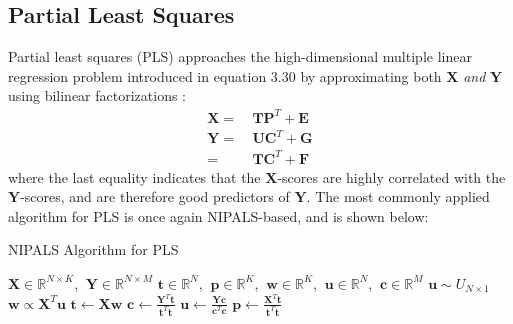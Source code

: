 \subsection{Partial Least Squares}

\begin{doublespace}
Partial least squares (PLS) approaches the high-dimensional multiple linear
regression problem introduced in equation 3.30 by approximating both
$\mathbf{X}$ \emph{and} $\mathbf{Y}$ using bilinear factorizations
\cite{wold:cils2001}:
\begin{align}
\mathbf{X} =& \: \mathbf{T} \mathbf{P}^T + \mathbf{E} \\
\mathbf{Y} =& \: \mathbf{U} \mathbf{C}^T + \mathbf{G} \\
           =& \: \mathbf{T} \mathbf{C}^T + \mathbf{F} \nonumber
\end{align}
where the last equality indicates that the $\mathbf{X}$-scores are highly
correlated with the $\mathbf{Y}$-scores, and are therefore good predictors
of $\mathbf{Y}$. The most commonly applied algorithm for PLS is once again
NIPALS-based, and is shown below:
\end{doublespace}

\begin{algorithm}[H]
\caption{NIPALS Algorithm for PLS}
\label{algorithm.3.2}
\begin{algorithmic}[1]
\REQUIRE $\mathbf{X} \in \mathbb{R}^{N \times K}$,%
       $\:\mathbf{Y} \in \mathbb{R}^{N \times M}$
\ENSURE $\mathbf{t} \in \mathbb{R}^N$,%
      $\:\mathbf{p} \in \mathbb{R}^K$,%
      $\:\mathbf{w} \in \mathbb{R}^K$,%
      $\:\mathbf{u} \in \mathbb{R}^N$,%
      $\:\mathbf{c} \in \mathbb{R}^M$
\STATE $\mathbf{u} \sim U_{N \times 1}$ 
\REPEAT
  \STATE $\mathbf{w} \propto \mathbf{X}^T \mathbf{u}$
  \STATE $\mathbf{t} \gets \mathbf{X} \mathbf{w}$
  \STATE $\mathbf{c} \gets \tfrac{\mathbf{Y}^T \mathbf{t}}
                                 {\mathbf{t}^T \mathbf{t}}$
  \STATE $\mathbf{u} \gets \tfrac{\mathbf{Y} \mathbf{c}}
                                 {\mathbf{c}^T \mathbf{c}}$
\UNTIL{$\tau < \varepsilon$}
\STATE $\mathbf{p} \gets \tfrac{\mathbf{X}^T \mathbf{t}}
                               {\mathbf{t}^T \mathbf{t}}$
\end{algorithmic}
\end{algorithm}

